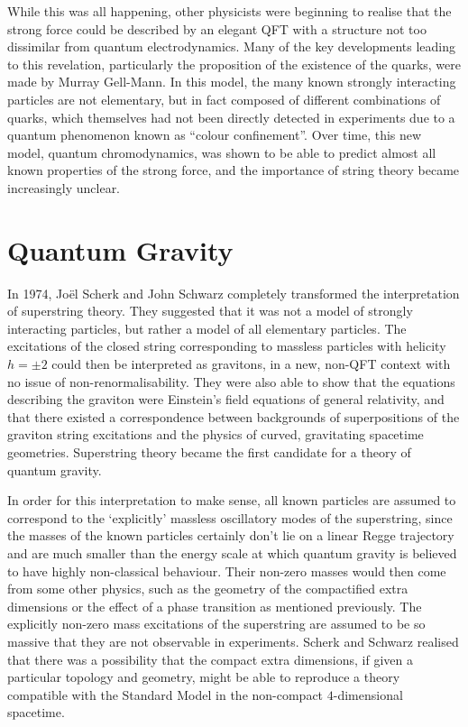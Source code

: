 \documentclass[12pt]{article}
\begin{document}
While this was all happening, other physicists were beginning to realise that the strong force could be described by an elegant QFT with a structure not too dissimilar from quantum electrodynamics. Many of the key developments leading to this revelation, particularly the proposition of the existence of the quarks, were made by Murray Gell-Mann. In this model, the many known strongly interacting particles are not elementary, but in fact composed of different combinations of quarks, which themselves had not been directly detected in experiments due to a quantum phenomenon known as ``colour confinement''. Over time, this new model, quantum chromodynamics, was shown to be able to predict almost all known properties of the strong force, and the importance of string theory became increasingly unclear.

\section{Quantum Gravity}

In 1974, Joël Scherk and John Schwarz completely transformed the interpretation of superstring theory. They suggested that it was not a model of strongly interacting particles, but rather a model of all elementary particles. The excitations of the closed string corresponding to massless particles with helicity $h = \pm 2$ could then be interpreted as gravitons, in a new, non-QFT context with no issue of non-renormalisability. They were also able to show that the equations describing the graviton were Einstein's field equations of general relativity, and that there existed a correspondence between backgrounds of superpositions of the graviton string excitations and the physics of curved, gravitating spacetime geometries. Superstring theory became the first candidate for a theory of quantum gravity.
\newline

In order for this interpretation to make sense, all known particles are assumed to correspond to the `explicitly' massless oscillatory modes of the superstring, since the masses of the known particles certainly don't lie on a linear Regge trajectory and are much smaller than the energy scale at which quantum gravity is believed to have highly non-classical behaviour. Their non-zero masses would then come from some other physics, such as the geometry of the compactified extra dimensions or the effect of a phase transition as mentioned previously. The explicitly non-zero mass excitations of the superstring are assumed to be so massive that they are not observable in experiments. Scherk and Schwarz realised that there was a possibility that the compact extra dimensions, if given a particular topology and geometry, might be able to reproduce a theory compatible with the Standard Model in the non-compact $4$-dimensional spacetime.
\newline
\end{document}
